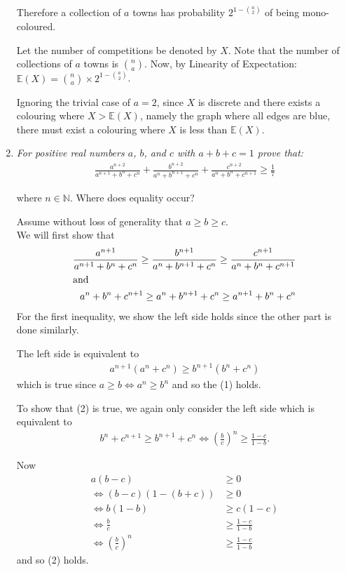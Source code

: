 \documentclass{article}
\begin{document}
\begin{enumerate}
Therefore a collection of $a$ towns has probability $2^{1-{{a}\choose{2}}}$ of being mono-coloured.

Let the number of competitions be denoted by ${X}$.
Note that the number of collections of $a$ towns is $\displaystyle \binom{n}{a}$.
Now, by Linearity of Expectation: $\displaystyle \mathbb{E}({X}) = {{n}\choose{a}} \times 2^{1-{{a}\choose{2}}}$.

Ignoring the trivial case of $a=2$, since $X$ is discrete and there exists a colouring where $X>\mathbb{E}({X})$, namely the graph where all edges are blue, there must exist a colouring where $X$ is less than $\mathbb{E}({X})$.

\medskip
\item %
{\itshape For positive real numbers $a$, $b$, and $c$ with $a+b+c=1$ prove that:
\begin{align*}
 	\frac{a^{n+2}}{a^{n+1} + b^n + c^n} + \frac{b^{n+2}}{a^n + b^{n+1} + c^n} + \frac{c^{n+2}}{a^n + b^n + c^{n+1}} \ge \frac{1}{7}
\end{align*}

where $n \in \mathbb{N}$. Where does equality occur?}

Assume without loss of generality that $a \geq b \geq c$.
\\ We will first show that 
\begin{align} 
\frac{a^{n+1}}{a^{n+1}+b^{n}+c^{n}} \geq \frac{b^{n+1}}{a^{n}+b^{n+1}+c^{n}} \geq \frac{c^{n+1}}{a^{n}+b^{n}+c^{n+1}} \\
\shortintertext{and}
a^{n}+b^{n}+c^{n+1} \geq a^{n}+b^{n+1}+c^{n} \geq a^{n+1}+b^{n}+c^{n}
\end{align}
For the first inequality, we show the left side holds since the other part is done similarly.

The left side is equivalent to
\begin{align*}
 a^{n+1}(a^{n}+c^{n}) \geq b^{n+1}(b^{n}+c^{n})
\end{align*}
which is true since $a \geq b \iff a^{n} \geq b^{n}$ and so the (1) holds. 

To show that (2) is true, we again only consider the left side which is equivalent to 
\begin{align*}
b^{n}+c^{n+1} \geq b^{n+1}+c^{n}
\iff \left(\frac{b}{c}\right)^{n} \geq \frac{1-c}{1-b}.
\end{align*}

Now
\begin{align*}
	a(b-c) &\geq 0 \\
	\iff (b-c)(1-(b+c)) &\geq 0 \\
	\iff b(1-b) &\geq c(1-c) \\
	\iff \frac{b}{c} &\geq \frac{1-c}{1-b} \\
	\iff \left(\frac{b}{c}\right)^{n} &\geq \frac{1-c}{1-b}
\end{align*}
and so (2) holds.


\end{enumerate}
\end{document}

